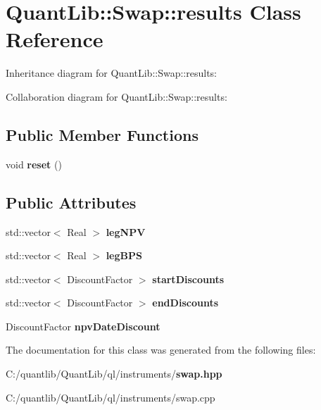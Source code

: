 \section{Quant\+Lib\+:\+:Swap\+:\+:results Class Reference}
\label{class_quant_lib_1_1_swap_1_1results}


Inheritance diagram for Quant\+Lib\+:\+:Swap\+:\+:results\+:


Collaboration diagram for Quant\+Lib\+:\+:Swap\+:\+:results\+:
\subsection*{Public Member Functions}
\begin{DoxyCompactItemize}
\item 
void {\bfseries reset} ()\label{class_quant_lib_1_1_swap_1_1results_a86bc754e829ec37c4470aae7d46ce3b7}

\end{DoxyCompactItemize}
\subsection*{Public Attributes}
\begin{DoxyCompactItemize}
\item 
std\+::vector$<$ Real $>$ {\bfseries leg\+N\+PV}\label{class_quant_lib_1_1_swap_1_1results_ad40fd63f0b1f3b6ae1b9251c56a2988b}

\item 
std\+::vector$<$ Real $>$ {\bfseries leg\+B\+PS}\label{class_quant_lib_1_1_swap_1_1results_ad3d56a4bce393336d8cd1f929670261f}

\item 
std\+::vector$<$ Discount\+Factor $>$ {\bfseries start\+Discounts}\label{class_quant_lib_1_1_swap_1_1results_a4a5736e56a036c4138c14dc2d7370174}

\item 
std\+::vector$<$ Discount\+Factor $>$ {\bfseries end\+Discounts}\label{class_quant_lib_1_1_swap_1_1results_a59afc6aada072db764c77454356e6e38}

\item 
Discount\+Factor {\bfseries npv\+Date\+Discount}\label{class_quant_lib_1_1_swap_1_1results_ac1643527b3548d08d5ef273cd73d367e}

\end{DoxyCompactItemize}


The documentation for this class was generated from the following files\+:\begin{DoxyCompactItemize}
\item 
C\+:/quantlib/\+Quant\+Lib/ql/instruments/{\bf swap.\+hpp}\item 
C\+:/quantlib/\+Quant\+Lib/ql/instruments/swap.\+cpp\end{DoxyCompactItemize}
